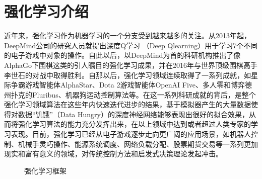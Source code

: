 \documentclass[letterpaper,10pt,english]{sphinxmanual}
\let\sphinxpxdimen\pdfpxdimen\else\newdimen\sphinxpxdimen
\begin{document}
\section{强化学习介绍}
\label{\detokenize{chapter_reinforcement_learning/rl_introduction:id1}}\label{\detokenize{chapter_reinforcement_learning/rl_introduction::doc}}
\sphinxAtStartPar
近年来，强化学习作为机器学习的一个分支受到越来越多的关注。从2013年起，DeepMind公司的研究人员就提出深度Q学习
（Deep
Q\sphinxhyphen{}learning）用于学习7个不同的电子游戏中对象的操作。自此以后，以DeepMind为首的科研机构推出了像AlphaGo下围棋这类的引人瞩目的强化学习成果，并在2016年与世界顶级围棋高手李世石的对战中取得胜利。自那以后，强化学习领域连续取得了一系列成就，如星际争霸游戏智能体AlphaStar、Dota
2游戏智能体OpenAI
Five、多人零和博弈德州扑克的Pluribus、机器狗运动控制算法等。在这一系列科研成就的背后，是整个强化学习领域算法在这些年内快速迭代进步的结果，基于模拟器产生的大量数据使得对数据“饥饿”（Data
Hungry）的深度神经网络能够表现出很好的拟合效果，从而将强化学习算法的能力充分发挥出来，在以上领域中达到或者超过人类专家的学习表现。目前，强化学习已经从电子游戏逐步走向更广阔的应用场景，如机器人控制、机械手灵巧操作、能源系统调度、网络负载分配、股票期货交易等一系列更加现实和富有意义的领域，对传统控制方法和启发式决策理论发起冲击。

\begin{figure}[H]
\centering
\capstart

\noindent\sphinxincludegraphics[width=400\sphinxpxdimen]{{ch12-rl}.png}
\caption{强化学习框架}\label{\detokenize{chapter_reinforcement_learning/rl_introduction:id3}}\label{\detokenize{chapter_reinforcement_learning/rl_introduction:ch12-ch12-rl-framework}}\end{figure}
\end{document}

